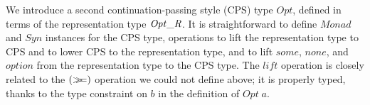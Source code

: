 \documentclass[authoryear,9pt]{sigplanconf}
\newcommand{\Conid}[1]{\mathit{#1}}
\newcommand{\Varid}[1]{\mathit{#1}}
\newcommand{\bind}{\mathbin{>\!\!\!>\mkern-6.7mu=}}
\begin{document}

We introduce a second continuation-passing style (CPS) type \ensuremath{\Conid{Opt}},
defined in terms of the representation type \ensuremath{\Conid{Opt\char95 R}}.  It is
straightforward to define \ensuremath{\Conid{Monad}} and \ensuremath{\Conid{Syn}} instances for the CPS
type, operations to lift the representation type to CPS and to lower
CPS to the representation type, and to lift \ensuremath{\Varid{some}}, \ensuremath{\Varid{none}}, and
\ensuremath{\Varid{option}} from the representation type to the CPS type.
The \ensuremath{\Varid{lift}} operation is closely related to the \ensuremath{(\bind )} operation
we could not define above; it is properly typed,
thanks to the type constraint on \ensuremath{\Varid{b}} in the definition of \ensuremath{\Conid{Opt}\;\Varid{a}}.
\end{document}
